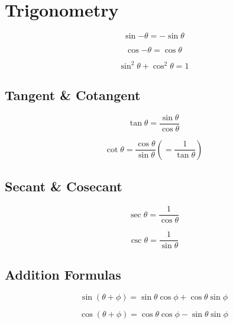 \documentclass[../main.tex]{subfiles}
\begin{document}
\section{Trigonometry}

$$
\sin{-\theta}=-\sin{\theta}
$$

$$
\cos{-\theta}=\cos{\theta}
$$

$$
\sin^2{\theta}+\cos^2{\theta}=1
$$

\subsection{Tangent \& Cotangent}

$$
\tan{\theta}=\frac{\sin{\theta}}{\cos{\theta}}
$$

$$
\cot{\theta}=\frac{\cos{\theta}}{\sin{\theta}}\left(=\frac{1}{\tan{\theta}}\right)
$$

\subsection{Secant \& Cosecant}

$$
\sec{\theta}=\frac{1}{\cos{\theta}}
$$

$$
\csc{\theta}=\frac{1}{\sin{\theta}}
$$

\subsection{Addition Formulas}

$$
\sin{(\theta+\phi)}=\sin{\theta}\cos{\phi}+\cos{\theta}\sin{\phi}
$$

$$
\cos{(\theta+\phi)}=\cos{\theta}\cos{\phi}-\sin{\theta}\sin{\phi}
$$
\end{document}
